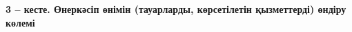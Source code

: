 {\bfseries 3 -- кесте. Өнеркәсіп өнімін (тауарларды, көрсетілетін
қызметтерді) өндіру көлемі}

% 
% 
